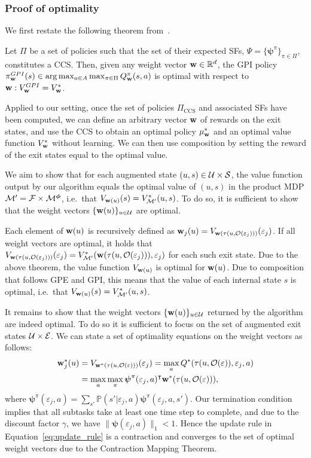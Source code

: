 \subsubsection{Proof of optimality} We first restate the following theorem from~\citep{Alegre2022}.

\begin{theorem}
Let $\Pi$ be a set of policies such that the set of their expected SFs, $\Psi=\{\boldsymbol{\psi}^\pi\}_{\pi\in\Pi}$, constitutes a CCS. Then, given any weight vector $\mathbf{w}\in\mathbb{R}^d$, the GPI policy $\pi_{\mathbf{w}}^{GPI}(s) \in \arg \max_{a\in A} \max_{\pi\in\Pi} Q_{\mathbf{w}}^\pi(s,a)$ is
optimal with respect to ${\mathbf{w}: V_{\mathbf{w}}^{GPI} = V_{\mathbf{w}}^*}$.
\end{theorem}

\noindent
Applied to our setting, once the set of policies $\Pi_\text{CCS}$ and associated SFs have been computed, we can define an arbitrary vector $\mathbf{w}$ of rewards on the exit states, and use the CCS to obtain an optimal policy $\mu_{\mathbf{w}}^*$ and an optimal value function $V_{\mathbf{w}}^*$ without learning. We can then use composition by setting the reward of the exit states equal to the optimal value.

We aim to show that for each augmented state ${(u,s)\in\mathcal{U}\times\mathcal{S}}$, the value function output by our algorithm equals the optimal value of $(u,s)$ in the product MDP $\mathcal{M}'=\mathcal{F}\times\mathcal{M}^{\boldsymbol{\phi}}$, i.e.~that $V_{\mathbf{w}(u)}(s)=V_{\mathcal{M}'}^*(u,s)$. To do so, it is sufficient to show that the weight vectors $\{\mathbf{w}(u)\}_{u\in\mathcal{U}}$ are optimal.

 Each element of $\mathbf{w}(u)$ is recursively defined as $\mathbf{w}_j(u)=V_{\mathbf{w}(\tau(u,\mathcal{O}(\varepsilon_j)))}(\varepsilon_j)$. If all weight vectors are optimal, it holds that $V_{\mathbf{w}(\tau(u,\mathcal{O}(\varepsilon_j)))}(\varepsilon_j)=V_{\mathcal{M}'}^*(\mathbf{w}(\tau(u,\mathcal{O}(\varepsilon_j))),\varepsilon_j)$ for each such exit state. Due to the above theorem, the value function $V_{\mathbf{w}(u)}$ is optimal for $\mathbf{w}(u)$. Due to composition that follows GPE and GPI, this means that the value of each internal state $s$ is optimal, i.e.~that $V_{\mathbf{w}(u)}(s)=V_{\mathcal{M}'}^*(u,s)$.

It remains to show that the weight vectors $\{\mathbf{w}(u)\}_{u\in\mathcal{U}}$ returned by the algorithm are indeed optimal. To do so it is sufficient to focus on the set of augmented exit states $\mathcal{U}\times\mathcal{E}$. We can state a set of optimality equations on the weight vectors as follows:
\begin{align*}
\mathbf{w}_j^*(u) &= V_{\mathbf{w}^*(\tau(u,\mathcal{O}(\varepsilon)))}(\varepsilon_j)= \max_a Q^*(\tau(u,\mathcal{O}(\varepsilon)),\varepsilon_j,a)\\
 &= \max_a\max_\pi {\boldsymbol{\psi}}^\pi(\varepsilon_j,a)^\intercal \mathbf{w}^*(\tau(u,\mathcal{O}(\varepsilon))),
\end{align*}
where ${\boldsymbol{\psi}}^\pi(\varepsilon_j,a)=\sum_{s'}\mathbb{P}(s'|\varepsilon_j,a)\boldsymbol{\psi}^\pi(\varepsilon_j,a,s')$. Our termination condition implies that all subtasks take at least one time step to complete, and due to the discount factor $\gamma$, we have $\lVert\boldsymbol{\psi}(\varepsilon_j,a)\rVert_1<1$. Hence the update rule in Equation~\eqref{eq:update_rule} is a contraction and converges to the set of optimal weight vectors due to the Contraction Mapping Theorem.

